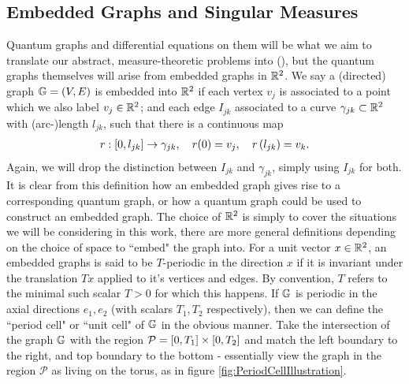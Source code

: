 \subsection{Embedded Graphs and Singular Measures} \label{ssec:EmbeddedGraphs}
Quantum graphs and differential equations on them will be what we aim to translate our abstract, measure-theoretic problems into (), but the quantum graphs themselves will arise from embedded graphs in $\mathbb{R}^2$.
We say a (directed) graph $\mathbb{G} = \left( V,E \right)$ is embedded into $\mathbb{R}^2$ if each vertex $v_j$ is associated to a point which we also label $v_j\in\mathbb{R}^2$; and each edge $I_{jk}$ associated to a curve $\gamma_{jk}\subset\mathbb{R}^2$ with (arc-)length $l_{jk}$, such that there is a continuous map
\begin{align*}
	r: \left[ 0,l_{jk} \right] \rightarrow \gamma_{jk}, \quad r(0) = v_j, \quad r\left( l_{jk} \right) = v_k.
\end{align*}
Again, we will drop the distinction between $I_{jk}$ and $\gamma_{jk}$, simply using $I_{jk}$ for both.
It is clear from this definition how an embedded graph gives rise to a corresponding quantum graph, or how a quantum graph could be used to construct an embedded graph.
The choice of $\mathbb{R}^2$ is simply to cover the situations we will be considering in this work, there are more general definitions depending on the choice of space to ``embed" the graph into.
For a unit vector $x\in\mathbb{R}^2$, an embedded graphs is said to be $T$-periodic in the direction $x$ if it is invariant under the translation $Tx$ applied to it's vertices and edges.
By convention, $T$ refers to the minimal such scalar $T>0$ for which this happens.
If $\mathbb{G}$ is periodic in the axial directions $e_1, e_2$ (with scalars $T_1, T_2$ respectively), then we can define the ``period cell" or ``unit cell" of $\mathbb{G}$ in the obvious manner.
Take the intersection of the graph $\mathbb{G}$ with the region $\mathcal{P} = \left[ 0,T_1 \right]\times\left[ 0,T_2 \right]$ and match the left boundary to the right, and top boundary to the bottom - essentially view the graph in the region $\mathcal{P}$ as living on the torus, as in figure \ref{fig:PeriodCellIllustration}.

